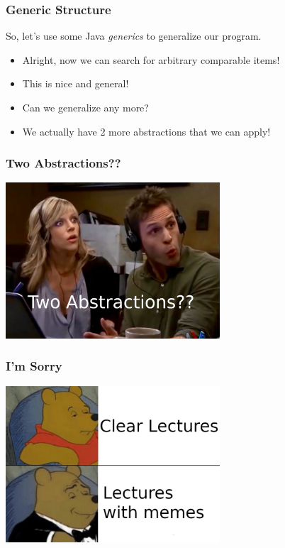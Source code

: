 \documentclass{beamer}
\begin{document}
\begin{frame}
  \frametitle{Generic Structure}
  So, let's use some Java \emph{generics} to generalize our program.
  \abstractTwo
  \begin{itemize}
  \item<2-> Alright, now we can search for arbitrary comparable items!
  \item<3-> This is nice and general!
  \item<4-> Can we generalize any more?
  \item<5-> We actually have 2 more abstractions that we can apply!
  \end{itemize}
\end{frame}

\begin{frame}
  \frametitle{Two Abstractions??}
  \centering \includegraphics[width=0.6\textwidth]{images/two-abstractions.jpg}
\end{frame}

\begin{frame}
  \frametitle{I'm Sorry}
  \centering \includegraphics[width=0.6\textwidth]{images/unnecessary.png}
\end{frame}

\end{document}
